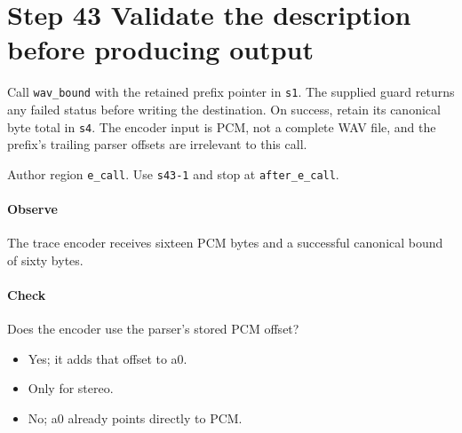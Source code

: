 \section{Step 43 Validate the description before producing output}\label{pcm-wav-s43}
Call \texttt{wav\_bound} with the retained prefix pointer in \texttt{s1}. The supplied guard returns any failed status before writing the destination. On success, retain its canonical byte total in \texttt{s4}. The encoder input is PCM, not a complete WAV file, and the prefix's trailing parser offsets are irrelevant to this call.

Author region \texttt{e\_call}. Use \texttt{s43-1} and stop at \texttt{after\_e\_call}.

\paragraph{Observe} The trace encoder receives sixteen PCM bytes and a successful canonical bound of sixty bytes.

\paragraph{Check} Does the encoder use the parser's stored PCM offset?
\begin{itemize}
  \item[A.] Yes; it adds that offset to a0.
  \item[B.] Only for stereo.
  \item[C.] No; a0 already points directly to PCM.
\end{itemize}
